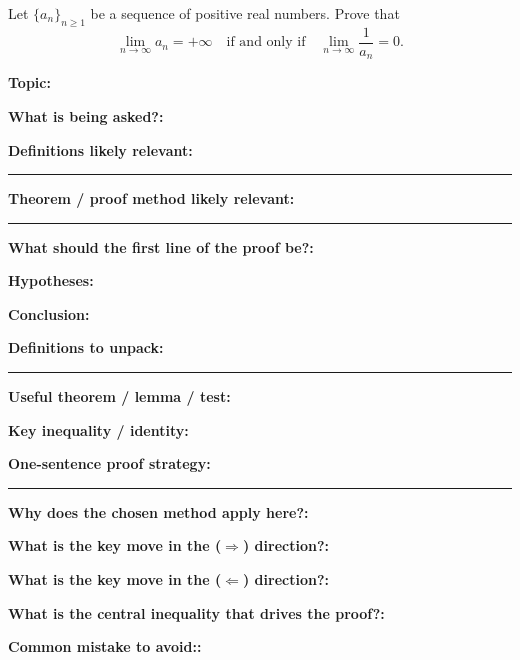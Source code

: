\documentclass[12pt]{article}
\newcommand{\fillfield}[1]{%
  \par\noindent\textbf{#1:}\enspace\hrulefill\par\vspace{3pt}%
}
\newcommand{\fillfieldlong}[1]{%
  \par\noindent\textbf{#1:}\par\vspace{1.5cm}%
  \noindent\rule{\linewidth}{0.35pt}\par\vspace{4pt}%
}
\begin{document}
\begin{tcolorbox}[
  enhanced, breakable,
  colback  = probblue,
  colframe = blue!55!black,
  fonttitle = \bfseries,
  title = {\textsc{Problem Statement}\hfill Homework 5, Problem 1}
]
Let $\{a_n\}_{n \geq 1}$ be a sequence of positive real numbers.
Prove that
\[
  \lim_{n \to \infty} a_n = +\infty
  \quad \text{if and only if} \quad
  \lim_{n \to \infty} \frac{1}{a_n} = 0.
\]
\end{tcolorbox}

\bigskip

\begin{tcolorbox}[
  enhanced, breakable,
  colback  = pass1green,
  colframe = green!55!black,
  fonttitle = \bfseries,
  title = {Pass 1 \enspace\textbf{--}\enspace First Diagnosis}
]
\fillfield{Topic}
\fillfield{What is being asked?}
\fillfieldlong{Definitions likely relevant}
\fillfieldlong{Theorem / proof method likely relevant}
\fillfield{What should the first line of the proof be?}
\end{tcolorbox}

\bigskip

\begin{tcolorbox}[
  enhanced, breakable,
  colback  = pass2yellow,
  colframe = yellow!65!black,
  fonttitle = \bfseries,
  title = {Pass 2 \enspace\textbf{--}\enspace Proof Recipe Card}
]
\fillfield{Hypotheses}
\fillfield{Conclusion}
\fillfieldlong{Definitions to unpack}
\fillfield{Useful theorem / lemma / test}
\fillfield{Key inequality / identity}
\fillfieldlong{One-sentence proof strategy}
\end{tcolorbox}

\bigskip

\begin{tcolorbox}[
  enhanced, breakable,
  colback  = pass3orange,
  colframe = orange!65!black,
  fonttitle = \bfseries,
  title = {Pass 3 \enspace\textbf{--}\enspace Self-Explanation}
]
\fillfield{Why does the chosen method apply here?}
\fillfield{What is the key move in the ($\Rightarrow$) direction?}
\fillfield{What is the key move in the ($\Leftarrow$) direction?}
\fillfield{What is the central inequality that drives the proof?}
\fillfield{Common mistake to avoid:}
\end{tcolorbox}
\end{document}
